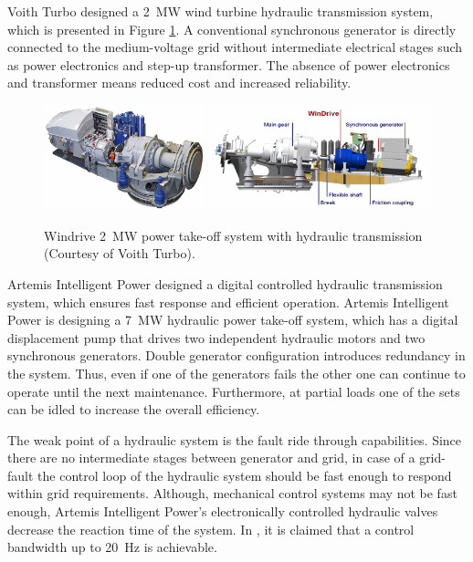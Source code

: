 \documentclass[a4paper, 11pt]{article} %
\begin{document}
Voith Turbo designed a 2~MW wind turbine hydraulic transmission system, which is presented in Figure \ref{voith}. A conventional synchronous generator is directly connected to the medium-voltage grid without intermediate electrical stages such as power electronics and step-up transformer. The absence of power electronics and transformer means reduced cost and increased reliability.

  \begin{figure}
    \centering
    \includegraphics[height=1.2in]{voith_windrive}
    \includegraphics[height=1.2in]{voith_schematic}
    \caption{Windrive 2~MW power take-off system with hydraulic transmission (Courtesy of Voith Turbo).} 
    \label{voith}
  \end{figure}

Artemis Intelligent Power designed a digital controlled hydraulic transmission system, which ensures fast response and efficient operation. Artemis Intelligent Power is designing a 7~MW hydraulic power take-off system, which has a digital displacement pump that drives two independent hydraulic motors and two synchronous generators. Double generator configuration introduces redundancy in the system. Thus, even if one of the generators fails the other one can continue to operate until the next maintenance. Furthermore, at partial loads one of the sets can be idled to increase the overall efficiency.

The weak point of a hydraulic system is the fault ride through capabilities. Since there are no intermediate stages between generator and grid, in case of a grid-fault the control loop of the hydraulic system should be fast enough to respond within grid requirements. Although, mechanical control systems may not be fast enough, Artemis Intelligent Power's electronically controlled hydraulic valves decrease the reaction time of the system. In \cite{artemis}, it is claimed that a control bandwidth up to 20~Hz is achievable.
\end{document}
